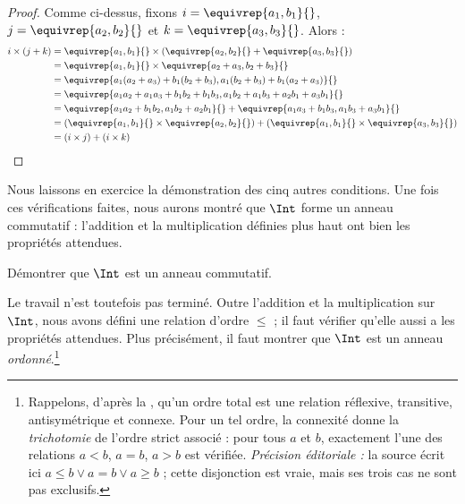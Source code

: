 \documentclass[11pt,a4paper,openany]{memoir}
\begin{document}
\begin{proof}
Comme ci-dessus, fixons $i = \equivrep{a_1, b_1}{}$,
$j = \equivrep{a_2,b_2}{}$ et $k = \equivrep{a_3, b_3}{}$. Alors :
\begin{align*}
  i \times (j + k)
  &= \equivrep{a_1, b_1}{} \times (\equivrep{a_2,b_2}{} + \equivrep{a_3, b_3}{})\\
  &= \equivrep{a_1, b_1}{} \times \equivrep{a_2 + a_3,b_2+b_3}{}\\
  &= \equivrep{a_1 (a_2 + a_3) + b_1 (b_2+b_3), a_1 (b_2 + b_3) + b_1 (a_2 + a_3)}{}\\
  &= \equivrep{a_1 a_2 + a_1a_3 + b_1 b_2+b_1b_3, a_1 b_2 + a_1b_3 + a_2b_1 + a_3b_1}{}\\
  &= \equivrep{a_1a_2 + b_1b_2, a_1b_2 + a_2b_1}{} + \equivrep{a_1a_3 + b_1b_3, a_1b_3 + a_3b_1}{}\\
  &= (\equivrep{a_1, b_1}{} \times \equivrep{a_2,b_2}{}) + (\equivrep{a_1, b_1}{} \times \equivrep{a_3, b_3}{})\\
  &= (i \times j) + (i \times k)
\end{align*}
\end{proof}

Nous laissons en exercice la démonstration des cinq autres conditions.
Une fois ces vérifications faites, nous aurons montré que $\Int$ forme
un anneau commutatif : l'addition et la multiplication définies plus
haut ont bien les propriétés attendues.

\begin{prob}
Démontrer que $\Int$ est un anneau commutatif.
\end{prob}

Le travail n'est toutefois pas terminé. Outre l'addition et la
multiplication sur $\Int$, nous avons défini une relation d'ordre
$\leq$ ; il faut vérifier qu'elle aussi a les propriétés attendues.
Plus précisément, il faut montrer que $\Int$ est un anneau
\emph{ordonné}.\footnote{Rappelons, d'après la
, qu'un ordre total est une
relation réflexive, transitive, antisymétrique et connexe. Pour un tel
ordre, la connexité donne la \emph{trichotomie} de l'ordre strict
associé : pour tous $a$ et $b$, exactement l'une des relations
$a < b$, $a = b$, $a > b$ est vérifiée.
\emph{Précision éditoriale :} la source écrit ici
$a \leq b \lor a = b \lor a \geq b$ ; cette disjonction est vraie,
mais ses trois cas ne sont pas exclusifs.}
\end{document}
